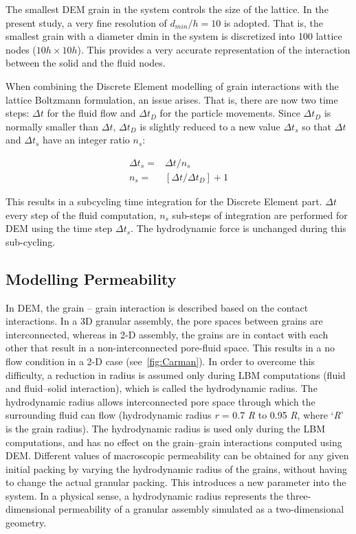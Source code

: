 \documentclass[12pt,twoside]{tuhhproc-en}
\begin{document}
The smallest DEM grain in the system controls the size of the lattice. In the present study, a very fine resolution of $d_{min}/h = 10$ is adopted. That is, the smallest grain with a diameter dmin in the system is discretized into 100 lattice nodes ($10h \times 10h$). This provides a very accurate representation of the interaction between the solid and the fluid nodes. 

When combining the Discrete Element modelling of grain interactions with the lattice Boltzmann formulation, an issue arises. That is, there are now two time steps: $\Delta t$ for the fluid flow and $\Delta t_D$ for the particle movements. Since $\Delta t_D$ is normally smaller than $\Delta t$, $\Delta t_D$ is slightly reduced to a new value $\Delta t_s$ so that $\Delta t$ and $\Delta t_s$ have an integer ratio $n_s$:

\begin{align}
  \Delta t_s = & \Delta t / n_s \\
  n_s  = & [\Delta t/\Delta t_D]+1
\end{align}

This results in a subcycling time integration for the Discrete Element part.  $\Delta t$ every step of the fluid computation, $n_s$ sub-steps of integration are performed for DEM using the time step  $\Delta t_s$. The hydrodynamic force is unchanged during this sub-cycling.

\subsection{Modelling Permeability}
In DEM, the grain -- grain interaction is described based on the contact interactions. In a 3D granular assembly, the pore spaces between grains are interconnected, whereas in 2-D assembly, the grains are in contact with each other that result in a non-interconnected pore-fluid space. This results in a no flow condition in a 2-D case (see~\cref{fig:Carman}). In order to overcome this difficulty, a reduction in radius is assumed only during LBM computations (fluid and fluid--solid interaction), which is called the hydrodynamic radius. The hydrodynamic radius allows interconnected pore space through which the surrounding fluid can flow (hydrodynamic radius \textit{r} = 0.7 \textit{R} to 0.95 \textit{R}, where `\textit{R}' is the grain radius). The hydrodynamic radius is used only during the LBM computations, and has no effect on the grain--grain interactions computed using DEM.  Different values of macroscopic permeability can be obtained for any given initial packing by varying the hydrodynamic radius of the grains, without having to change the actual granular packing. This introduces a new parameter into the system. In a physical sense, a hydrodynamic radius represents the three-dimensional permeability of a granular assembly simulated as a two-dimensional geometry.
\end{document}
